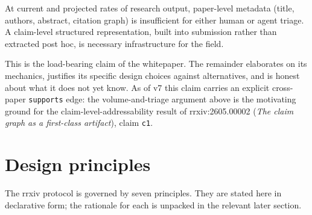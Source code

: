 \documentclass[11pt]{rrxiv}
\begin{document}
\begin{claim}[title=Volume necessitates structure, type=theoretical, evidence=argument, labels={design-thesis}, confidence=0.7, rationale={A design bet stated as such: the live corpus is far too small to test it yet}]
\label{claim:volume-structure}
At current and projected rates of research output, paper-level metadata (title, authors, abstract, citation graph) is insufficient for either human or agent triage. A claim-level structured representation, built into submission rather than extracted post hoc, is necessary infrastructure for the field.
\end{claim}

This is the load-bearing claim of the whitepaper. The remainder elaborates on its mechanics, justifies its specific design choices against alternatives, and is honest about what it does not yet know. As of v7 this claim carries an explicit cross-paper \texttt{supports} edge: the volume-and-triage argument above is the motivating ground for the claim-level-addressability result of rrxiv:2605.00002 (\emph{The claim graph as a first-class artifact}), claim \texttt{c1}.

\section{Design principles}
\label{sec:principles}

The rrxiv protocol is governed by seven principles. They are stated here in declarative form; the rationale for each is unpacked in the relevant later section.
\end{document}
